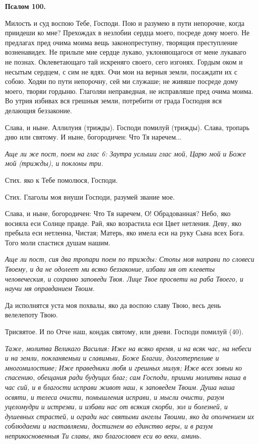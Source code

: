\medskip


\bfseries Псалом 100.\normalfont{}\nopagebreak


Милость и суд воспою Тебе, Господи. Пою и разумею в пути непорочне, когда приидеши ко мне? Прехождах в незлобии сердца моего, посреде дому моего. Не предлагах пред очима моима вещь законопреступну, творящия преступление возненавидех. Не прильпе мне сердце лукаво, уклоняющагося от мене лукаваго не познах. Оклеветающаго тай искреняго своего, сего изгонях. Гордым оком и несытым сердцем, с сим не ядях. Очи мои на верныя земли, посаждати их с собою. Ходяи по пути непорочну, сей ми служаше; не живяше посреде дому моего, творяи гордыню. Глаголяи неправедная, не исправляше пред очима моима. Во утрия избивах вся грешныя земли, потребити от града Господня вся делающия беззаконие. 

Слава, и ныне. Аллилуия (трижды). Господи помилуй (трижды). Слава, тропарь дню или святому. И ныне, богородичен: Что Тя наречем...


\itshape Аще ли же пост, поем на глас 6:\normalfont{} Заутра услыши глас мой, Царю мой и Боже мой (трижды), и поклоны три.

Стих. яко к Тебе помолюся, Господи.

Стих. Глаголы моя внуши Господи, разумей звание мое.

Слава, и ныне, богородичен: Что Тя наречем, О! Обрадованная? Небо, яко восияла еси Солнце правде. Рай, яко возрастила еси Цвет нетления. Деву, яко пребыла еси нетленна, Чистая; Матерь, яко имела еси на руку Сына всех Бога. Того моли спастися душам нашим.


\itshape Аще ли пост, сия два тропари поем по трижды:\normalfont{} Стопы моя направи по словеси Твоему, и да не одолеет ми всяко беззаконие, избави мя от клеветы человеческия, и сохраню заповеди Твоя. Лице Твое просвети на раба Твоего, и научи мя оправданием Твоим.

Да исполнятся уста моя похвалы, яко да воспою славу Твою, весь день велелепоту Твою. 

Трисвятое. И по Отче наш, кондак святому, или дневи. Господи помилуй (40).


\itshape Таже, молитва Великаго Василия:\normalfont{} Иже на всяко время, и на всяк час, на небеси и на земли, покланяемыи и славимыи, Боже Благии, долготерпеливе и многомилостиве; Иже праведники любя и грешных милуя; Иже всех зовыи ко спасению, обещания ради будущих благ; сам Господи, приими молитвы наша в час сий, и в благости исправи живот наш, к заповедем Твоим. Душа наша освяти, и телеса очисти, помышления исправи, и мысли очисти, разум уцеломудри и истрезви, и избави нас от всякия скорби, зол и болезней, и душевных страстей, и огради нас святыми ангелы Твоими, яко да ополчением их соблюдаеми и наставляеми, достигнем во единство веры, и в разум неприкосновенныя Ти славы, яко благословен еси во веки, аминь. 

